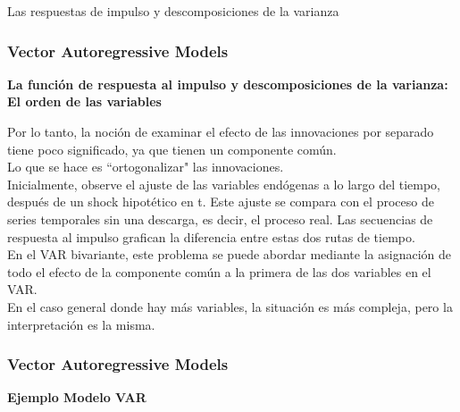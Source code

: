 \documentclass[spanish,xcolor=table]{beamer}
\begin{document}
\begin{section}{Las respuestas de impulso y descomposiciones de la varianza}
\begin{frame}
\end{frame}
\begin{frame}
\frametitle{Vector Autoregressive Models}

\textbf{La funci\'on de respuesta al impulso y descomposiciones de la varianza: El orden de las variables}

Por lo tanto, la noci\'on de examinar el efecto de las innovaciones por separado tiene poco significado, ya que tienen un componente com\'un.\\
Lo que se hace es ``ortogonalizar" las innovaciones.\\
Inicialmente, observe el ajuste de las variables end\'ogenas a lo largo del tiempo, despu\'es de un shock hipot\'etico en t. Este ajuste se compara con el proceso de series temporales sin una descarga, es decir, el proceso real. Las secuencias de respuesta al impulso grafican la diferencia entre estas dos rutas de tiempo.\\
En el VAR bivariante, este problema se puede abordar mediante la asignaci\'on de todo el efecto de la componente com\'un a la primera de las dos variables en el VAR.\\
En el caso general donde hay m\'as variables, la situación es m\'as compleja, pero la interpretaci\'on es la misma.

\end{frame}
\end{section}
\begin{frame}
\frametitle{Vector Autoregressive Models}
\textbf{Ejemplo Modelo VAR}


\end{frame}
\end{document}
